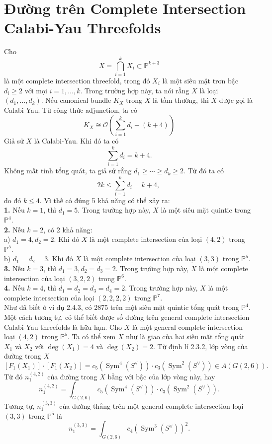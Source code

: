 \documentclass[11pt,a4paper]{book}
\begin{document}
\section{Đường trên Complete Intersection Calabi-Yau Threefolds}

Cho
$$X=\bigcap_{i=1}^k X_i \subset \mathbb{P}^{k+3}$$
là một complete intersection threefold, trong đó $X_i$ là một siêu mặt trơn bậc $d_i \geq 2$ với mọi $i=1, \ldots, k$. Trong trường hợp này, ta nói rằng $X$ là loại $\left(d_1, \ldots, d_k\right)$. Nếu canonical bundle $K_X$ trong $X$ là tầm thường, thì $X$ được gọi là Calabi-Yau. Từ công thức adjunction, ta có
$$K_X \cong \mathcal{O}\left(\sum_{i=1}^k d_i-(k+4)\right) $$
Giả sử $X$ là Calabi-Yau. Khi đó ta có
$$
\sum_{i=1}^k d_i=k+4 .
$$
Không mất tính tổng quát, ta giả sử rằng $d_1 \geq \cdots \geq d_k \geq 2$. Từ đó ta có
$$
2 k \leq \sum_{i=1}^k d_i=k+4 \text {, }
$$
do đó $k \leq 4$. Vì thế có đúng 5 khả năng có thể xảy ra:\\
\textbf{1.} Nếu $k=1$, thì $d_1=5$. Trong trường hợp này, $X$ là một siêu mặt quintic trong $\mathbb{P}^4$.\\
\textbf{2.} Nếu $k=2$, có 2 khả năng:\\
a) $d_1=4, d_2=2$. Khi đó $X$ là một complete intersection của loại $(4,2)$ trong $\mathbb{P}^5$.\\
b) $d_1=d_2=3$. Khi đó $X$ là một complete intersection của loại $(3,3)$ trong $\mathbb{P}^5$.\\
\textbf{3.} Nếu $k=3$, thì $d_1=3, d_2=d_3=2$. Trong trường hợp này, $X$ là một complete intersection của loại $(3,2,2)$ trong $\mathbb{P}^6$.\\
\textbf{4.} Nếu $k=4$, thì $d_1=d_2=d_3=d_4=2$. Trong trường hợp này, $X$ là một complete intersection của loại $(2,2,2,2)$ trong $\mathbb{P}^7$.\\
Như đã biết ở ví dụ 2.4.3, có 2875 trên một siêu mặt quintic tổng quát trong $\mathbb{P}^4$. Một cách tương tự, có thể biết được số đường trên general complete intersection Calabi-Yau threefolds là hữu hạn.
Cho $X$ là một general complete intersection loại $(4,2)$ trong $\mathbb{P}^5$. Ta có thể xem $X$ như là giao của hai siêu mặt tổng quát $X_1$ và $X_2$ với $\operatorname{deg}\left(X_1\right)=4$ và $\operatorname{deg}\left(X_2\right)=2$. Từ định lí 2.3.2, lớp vòng của đường trong $X$
$$\left[F_1\left(X_1\right)\right] \cdot\left[F_1\left(X_2\right)\right]=c_5\left(\operatorname{Sym}^4\left(S^{\vee}\right)\right) \cdot c_3\left(\operatorname{Sym}^2\left(S^{\vee}\right)\right) \in A(G(2,6)) .$$
Từ đó $n_1^{(4,2)}$ của đường trong $X$ bằng với bậc của lớp vòng này, hay
$$
n_1^{(4,2)}=\int_{G(2,6)} c_5\left(\operatorname{Sym}^4\left(S^{\vee}\right)\right) \cdot c_3\left(\operatorname{Sym}^2\left(S^{\vee}\right)\right) .
$$
Tương tự, $n_1^{(3,3)}$ của đường thẳng trên một general complete intersection loại $(3,3)$ trong $\mathbb{P}^5$ là
$$
n_1^{(3,3)}=\int_{G(2,6)} c_4\left(\operatorname{Sym}^3\left(S^{\vee}\right)\right)^2 .
$$
\end{document}
